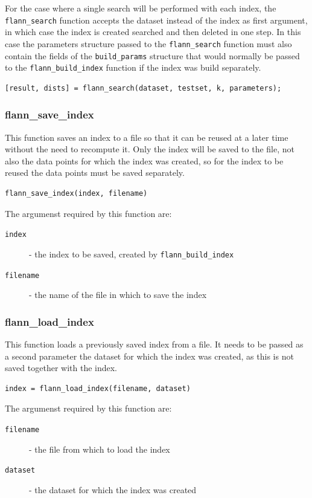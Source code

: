 \documentclass[letter,10pt]{article}
\begin{document}
For the case where a single search will be performed with each index, the
\texttt{flann\_search} function accepts the dataset instead of the index as
first argument, in which case the index is created searched and then
deleted in one step. In this case the parameters structure passed to the
\texttt{flann\_search} function must also contain the fields of the
\texttt{build\_params} structure that would normally be passed to the
\texttt{flann\_build\_index} function if the index was build separately.
\begin{Verbatim}
[result, dists] = flann_search(dataset, testset, k, parameters);
\end{Verbatim}

\subsubsection{flann\_save\_index}

This function saves an index to a file so that it can be reused at a later time without
the need to recompute it. Only the index will be saved to the file, not also the data
points for which the index was created, so for the index to be reused the data 
points must be saved separately.
\begin{Verbatim}[fontsize=\footnotesize,frame=single]
flann_save_index(index, filename)
\end{Verbatim}

The argumenst required by this function are:
\begin{description}
\item[\texttt{index}] - the index to be saved, created by \texttt{flann\_build\_index}
\item[\texttt{filename}] - the name of the file in which to save the index
\end{description}



\subsubsection{flann\_load\_index}

This function loads a previously saved index from a file. It needs to be passed as a second 
parameter the dataset for which the index was created, as this is not saved together with the
index.
\begin{Verbatim}[fontsize=\footnotesize,frame=single]
index = flann_load_index(filename, dataset)
\end{Verbatim}
The argumenst required by this function are:
\begin{description}
\item[\texttt{filename}] - the file from which to load the index
\item[\texttt{dataset}] - the dataset for which the index was created
\end{description}
\end{document}
